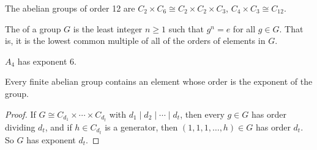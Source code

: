 \documentclass[a4paper]{scrartcl}
\begin{document}
\begin{example}
	The abelian groups of order 12 are $C_{2} \times C_6 \cong C_2 \times C_2 \times C_3$, $C_4 \times C_3 \cong C_{12}$.
\end{example}

\begin{definition}[Exponent]
	The  of a group $G$ is the least integer $n \geq 1$ such that $g^n = e$ for all $g \in G$. That is, it is the lowest common multiple of all of the orders of elements in $G$.
\end{definition}

\begin{example}
	$A_4$ has exponent 6.
\end{example}

\begin{corollary}
	Every finite abelian group contains an element whose order is the exponent of the group.
\end{corollary}
\begin{proof}
	If $G \cong C_{d_1} \times \cdots \times C_{d_t}$ with $d_1 \mid d_2 \mid \cdots \mid d_t$, then every $g \in G$ has order dividing $d_t$, and if $h \in C_{d_t}$ is a generator, then $(1, 1, 1, \dots, h) \in G$ has order $d_t$. So $G$ has exponent $d_t$.
\end{proof}
\end{document}
